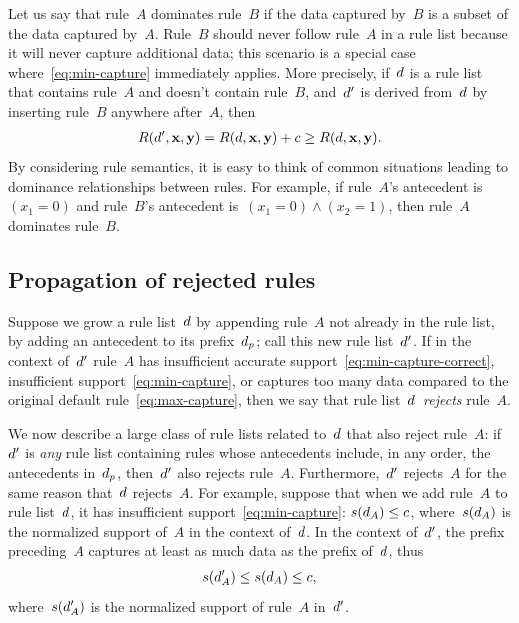 Let us say that rule~$A$ dominates rule~$B$ if the data captured by~$B$ is a subset of the data captured by~$A$.
%
Rule~$B$ should never follow rule~$A$ in a rule list because it will never capture additional data;
this scenario is a special case where~\eqref{eq:min-capture} immediately applies.
%
More precisely, if~${d}$ is a rule list that contains rule~$A$ and doesn't contain rule~$B$,
and~${d}'$ is derived from~${d}$ by inserting rule~$B$ anywhere after~$A$, then
\begin{align}
\Obj(\RL', \x, \y) = \Obj(\RL, \x, \y) + c \ge \Obj(\RL, \x, \y).
\end{align}
By considering rule semantics, it is easy to think of common situations
leading to dominance relationships between rules.
%
For example, if rule~$A$'s antecedent is~${(x_1 = 0)}$ and rule~$B$'s
antecedent is~${(x_1 = 0) \wedge (x_2 = 1)}$, then rule~$A$ dominates rule~$B$.
%

\subsection{Propagation of rejected rules}

Suppose we grow a rule list~${d}$ by appending rule~$A$ not already in the rule list,
\ie by adding an antecedent to its prefix~$d_p$; call this new rule list~${d}'$.
%
If in the context of~${d}'$ rule~$A$ has insufficient accurate support~\eqref{eq:min-capture-correct},
insufficient support~\eqref{eq:min-capture},
or captures too many data compared to the original default rule~\eqref{eq:max-capture},
then we say that rule list~${d}$~\emph{rejects} rule~$A$.

We now describe a large class of rule lists related to~${d}$ that also reject rule~$A$:
if~${d}'$ is \emph{any} rule list containing rules whose antecedents include,
in any order, the antecedents in~$d_p$, then~${d}'$ also rejects rule~$A$.
%
Furthermore,~${d}'$ rejects~$A$ for the same reason that~${d}$ rejects~$A$.
%
For example, suppose that when we add rule~$A$ to rule list~${d}$,
it has insufficient support~\eqref{eq:min-capture}: ${s({d}_A) \le c}$,
where~$s({d}_A)$ is the normalized support of~$A$ in the context of~${d}$.
%
In the context of~${d}'$, the prefix preceding~$A$ captures at least
as much data as the prefix of~${d}$, thus
\begin{align}
s(\RL'_A) \le s(\RL_A) \le c,
\end{align}
where~$s({d}'_A)$ is the normalized support of rule~$A$ in~${d}'$.

